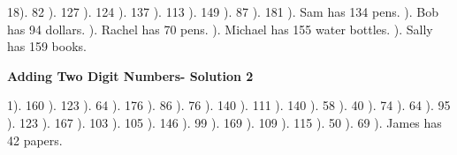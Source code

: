 \documentclass{article}%
\begin{document}
18). 82%
). 127%
). 124%
). 137%
). 113%
). 149%
). 87%
). 181%
). Sam has 134 pens.%
). Bob has 94 dollars.%
). Rachel has 70 pens.%
). Michael has 155 water bottles.%
). Sally has 159 books.%
\newline%
\newpage%
\large%
\begin{center}%
\textbf{Adding Two Digit Numbers- Solution 2}%
\newline%
\end{center} \normalsize%
1). 160%
). 123%
). 64%
). 176%
). 86%
). 76%
). 140%
). 111%
). 140%
). 58%
). 40%
). 74%
). 64%
). 95%
). 123%
). 167%
). 103%
). 105%
). 146%
). 99%
). 169%
). 109%
). 115%
). 50%
). 69%
). James has 42 papers.%
\end{document}
